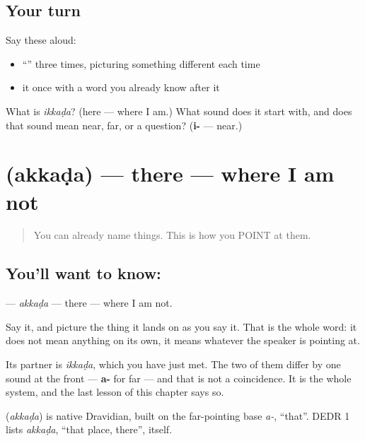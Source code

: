 \subsection*{Your turn}
Say these aloud:

\begin{itemize}
\raggedright
  \item \textquotedblleft{}\textquotedblright{} three times, picturing something different each time
  \item it once with a word you already know after it
\end{itemize}

\begin{tcolorbox}[breakable,colback=teal!4,colframe=teal!35!black,title={Before you move on}]
What is \emph{ikkaḍa}? (here — where I am.) What sound does it start with, and does that sound mean near, far, or a question? (\textbf{i-} — near.)
\end{tcolorbox}
\section[\texorpdfstring{\te{అక్కడ} (akkaḍa)}{అక్కడ (akkaḍa)}]{ (akkaḍa) — there — where I am not}

\label{lesson:TE-C41-there}



\begin{quote}
You can already name things. This is how you POINT at them.
\end{quote}

\subsection*{You'll want to know: }
\textbf{} — \emph{akkaḍa} — there — where I am not.

Say it, and picture the thing it lands on as you say it. That is the whole word: it does not mean anything on its own, it means whatever the speaker is pointing at.

Its partner is \textbf{} \emph{ikkaḍa}, which you have just met. The two of them differ by one sound at the front — \textbf{a-} for far — and that is not a coincidence. It is the whole system, and the last lesson of this chapter says so.

\begin{cousinweb}
\textbf{} (\emph{akkaḍa}) is native Dravidian, built on the far-pointing base \emph{a-}, \textquotedblleft{}that\textquotedblright{}. DEDR 1 lists \emph{akkaḍa}, \textquotedblleft{}that place, there\textquotedblright{}, itself.
\end{cousinweb}

